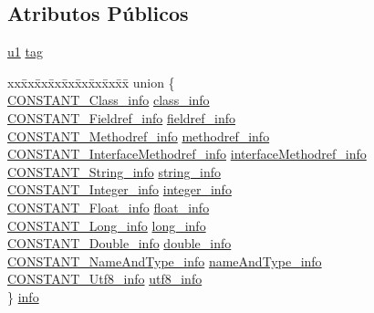 \subsection*{Atributos Públicos}
\begin{DoxyCompactItemize}
\item 
\hyperlink{BasicTypes_8h_ad9f4cdb6757615aae2fad89dab3c5470}{u1} \hyperlink{structcp__info_a045b8801a6e96a2a31d3b62ea684f141}{tag}
\item 
\begin{tabbing}
xx\=xx\=xx\=xx\=xx\=xx\=xx\=xx\=xx\=\kill
union \{\\
\>\hyperlink{structCONSTANT__Class__info}{CONSTANT\_Class\_info} \hyperlink{structcp__info_add01ad1b269bc065f0863469cf8183b8}{class\_info}\\
\>\hyperlink{structCONSTANT__Fieldref__info}{CONSTANT\_Fieldref\_info} \hyperlink{structcp__info_a12c0c04a72137ea73d22a3d652de1774}{fieldref\_info}\\
\>\hyperlink{structCONSTANT__Methodref__info}{CONSTANT\_Methodref\_info} \hyperlink{structcp__info_ab1304804bef6a0fe6575671223d7d689}{methodref\_info}\\
\>\hyperlink{structCONSTANT__InterfaceMethodref__info}{CONSTANT\_InterfaceMethodref\_info} \hyperlink{structcp__info_aaebedef650f8f22c5f66057bf1b1271a}{interfaceMethodref\_info}\\
\>\hyperlink{structCONSTANT__String__info}{CONSTANT\_String\_info} \hyperlink{structcp__info_a4d1d5a06448e8b86b4b23608d64cfe7e}{string\_info}\\
\>\hyperlink{structCONSTANT__Integer__info}{CONSTANT\_Integer\_info} \hyperlink{structcp__info_a134087258f855dca61e8e8922665d050}{integer\_info}\\
\>\hyperlink{structCONSTANT__Float__info}{CONSTANT\_Float\_info} \hyperlink{structcp__info_a367569f3e0a70a50afc482c4ac2aece1}{float\_info}\\
\>\hyperlink{structCONSTANT__Long__info}{CONSTANT\_Long\_info} \hyperlink{structcp__info_ab0a2bfb802609dbdb4985cb55f465e6f}{long\_info}\\
\>\hyperlink{structCONSTANT__Double__info}{CONSTANT\_Double\_info} \hyperlink{structcp__info_aa76301d1853395d7594520988422c3d0}{double\_info}\\
\>\hyperlink{structCONSTANT__NameAndType__info}{CONSTANT\_NameAndType\_info} \hyperlink{structcp__info_a1e020df4bc85c0a41365a8bb466f8781}{nameAndType\_info}\\
\>\hyperlink{structCONSTANT__Utf8__info}{CONSTANT\_Utf8\_info} \hyperlink{structcp__info_a980c5cbcb2aefe984b7a4988f1f71576}{utf8\_info}\\
\} \hyperlink{structcp__info_a8aca171d81e9715b113c7919e8c16dce}{info}\\

\end{tabbing}\end{DoxyCompactItemize}


